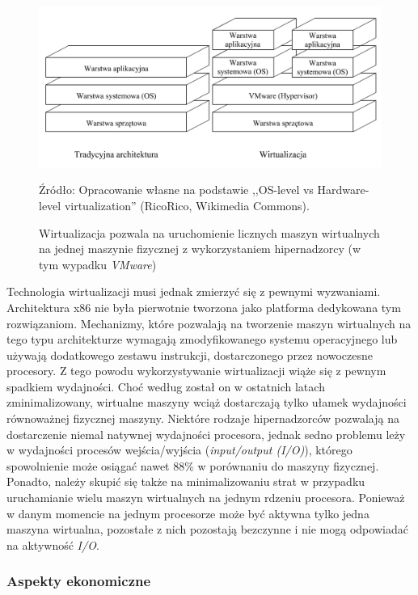 \documentclass[12pt,a4paper,twoside]{article}
\newcommand{\source}[1]{\caption*{\hfill Źródło: {#1}} }
\begin{document}
\begin{figure}[h]
  \centering
\includegraphics[scale=0.4]{../obrazy/fig:vm.png}
\caption{Wirtualizacja pozwala na uruchomienie licznych maszyn wirtualnych na jednej maszynie fizycznej z wykorzystaniem hipernadzorcy (w tym wypadku \textit{VMware}) \label{fig:vm}}
\source{Opracowanie własne na podstawie ,,OS-level vs Hardware-level virtualization'' (RicoRico, Wikimedia Commons).}
\end{figure}

Technologia wirtualizacji musi jednak zmierzyć się z pewnymi wyzwaniami. Architektura x86 nie była pierwotnie tworzona jako platforma dedykowana tym rozwiązaniom. Mechanizmy, które pozwalają na tworzenie maszyn wirtualnych na tego typu architekturze wymagają zmodyfikowanego systemu operacyjnego lub używają dodatkowego zestawu instrukcji, dostarczonego przez nowoczesne procesory. Z tego powodu wykorzystywanie wirtualizacji wiąże się z pewnym spadkiem wydajności. Choć według \citet{menon2005} został on w ostatnich latach zminimalizowany, wirtualne maszyny wciąż dostarczają tylko ułamek wydajności równoważnej fizycznej maszyny. Niektóre rodzaje hipernadzorców pozwalają na dostarczenie niemal natywnej wydajności procesora, jednak sedno problemu leży w wydajności procesów wejścia/wyjścia (\textit{input/output (I/O)}), którego spowolnienie może osiągać nawet 88\% w porównaniu do maszyny fizycznej. Ponadto, należy skupić się także na minimalizowaniu strat w przypadku uruchamianie wielu maszyn wirtualnych na jednym rdzeniu procesora. Ponieważ w danym momencie na jednym procesorze może być aktywna tylko jedna maszyna wirtualna, pozostałe z nich pozostają bezczynne i nie mogą odpowiadać na aktywność \textit{I/O}.

\subsubsection{Aspekty ekonomiczne}
\end{document}
